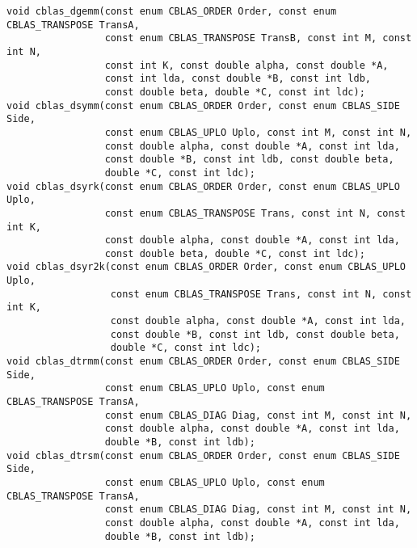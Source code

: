 \documentclass{article}
\begin{document}
\begin{Verbatim}[fontsize=\small,fontfamily=tt,fontshape=rm]
void cblas_dgemm(const enum CBLAS_ORDER Order, const enum CBLAS_TRANSPOSE TransA,
                 const enum CBLAS_TRANSPOSE TransB, const int M, const int N,
                 const int K, const double alpha, const double *A,
                 const int lda, const double *B, const int ldb,
                 const double beta, double *C, const int ldc);
void cblas_dsymm(const enum CBLAS_ORDER Order, const enum CBLAS_SIDE Side,
                 const enum CBLAS_UPLO Uplo, const int M, const int N,
                 const double alpha, const double *A, const int lda,
                 const double *B, const int ldb, const double beta,
                 double *C, const int ldc);
void cblas_dsyrk(const enum CBLAS_ORDER Order, const enum CBLAS_UPLO Uplo,
                 const enum CBLAS_TRANSPOSE Trans, const int N, const int K,
                 const double alpha, const double *A, const int lda,
                 const double beta, double *C, const int ldc);
void cblas_dsyr2k(const enum CBLAS_ORDER Order, const enum CBLAS_UPLO Uplo,
                  const enum CBLAS_TRANSPOSE Trans, const int N, const int K,
                  const double alpha, const double *A, const int lda,
                  const double *B, const int ldb, const double beta,
                  double *C, const int ldc);
void cblas_dtrmm(const enum CBLAS_ORDER Order, const enum CBLAS_SIDE Side,
                 const enum CBLAS_UPLO Uplo, const enum CBLAS_TRANSPOSE TransA,
                 const enum CBLAS_DIAG Diag, const int M, const int N,
                 const double alpha, const double *A, const int lda,
                 double *B, const int ldb);
void cblas_dtrsm(const enum CBLAS_ORDER Order, const enum CBLAS_SIDE Side,
                 const enum CBLAS_UPLO Uplo, const enum CBLAS_TRANSPOSE TransA,
                 const enum CBLAS_DIAG Diag, const int M, const int N,
                 const double alpha, const double *A, const int lda,
                 double *B, const int ldb);


\end{Verbatim}
\end{document}
